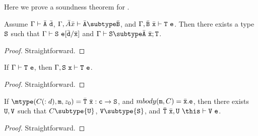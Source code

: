 Here we prove a soundness theorem for \CFJ{}.  

\begin{lemma}
\label{substitution}
Assume $\Gamma \vdash \bar{\tt A}\ \bar{\tt d}$, 
$\Gamma, \bar{A} \bar{x} \vdash \bar{\tt A}\subtype \bar{\tt B}$, and 
$\Gamma, \bar{\tt B}\ \bar{\tt x} \vdash {\tt T}\ {\tt e}$. 
Then there exists a type ${\tt S}$ such that 
$\Gamma \vdash {\tt S}\ {\tt e}[\bar{\tt d}/\bar{\tt x}]$ and
$\Gamma \vdash {\tt S} \subtype \bar{\tt A}\ \bar{\tt x};{\tt T}$.
\end{lemma}

\begin{proof}
Straightforward.
\end{proof}

\begin{lemma}[Weakening]
\label{weakening}
If $\Gamma \vdash {\tt T}\ {\tt e}$, then $\Gamma, {\tt S}\ {\tt x}\vdash {\tt T}\ {\tt e}$.
\end{lemma}

\begin{proof}
Straightforward.
\end{proof}

\begin{lemma}
\label{body-type}
If $\mtype(C(:d),{\tt m},z_0)=\bar{\tt T}\ \bar{\tt x} : {\tt c}
\rightarrow {\tt S}$, and $mbody({\tt m}, C)=\bar{\tt x}.{\tt e}$, 
then there exists ${\tt U}, {\tt V}$ such that
$C \subtype {\tt U}$, ${\tt V}\subtype {\tt S}$, and
$\bar{\tt T}\ \bar{\tt x},{\tt U}\ \this \vdash {\tt V}\ {\tt e}$.
\end{lemma}

\begin{proof}
Straightforward.
\end{proof}

